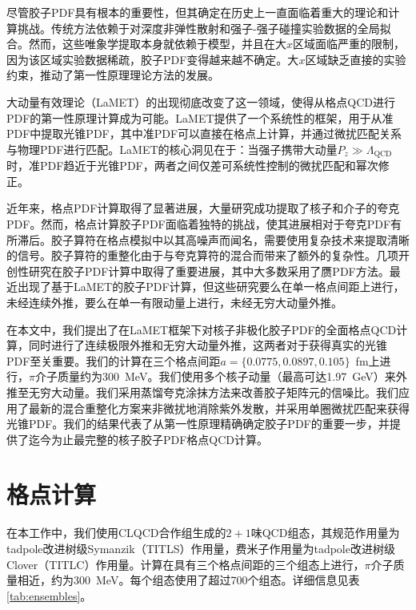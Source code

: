 \documentclass[12pt,a4paper]{ctexart}
\begin{document}
尽管胶子PDF具有根本的重要性，但其确定在历史上一直面临着重大的理论和计算挑战。传统方法依赖于对深度非弹性散射和强子-强子碰撞实验数据的全局拟合\cite{MSHT20,CT18,NNPDF31,NNPDF40,JAM16,CT14}。然而，这些唯象学提取本身就依赖于模型，并且在大$x$区域面临严重的限制，因为该区域实验数据稀疏，胶子PDF变得越来越不确定。大$x$区域缺乏直接的实验约束，推动了第一性原理理论方法的发展。

大动量有效理论（LaMET）\cite{Ji13,Ji14,Ji17}的出现彻底改变了这一领域，使得从格点QCD进行PDF的第一性原理计算成为可能。LaMET提供了一个系统性的框架，用于从准PDF中提取光锥PDF，其中准PDF可以直接在格点上计算，并通过微扰匹配关系与物理PDF进行匹配。LaMET的核心洞见在于：当强子携带大动量$P_z \gg \Lambda_{\text{QCD}}$时，准PDF趋近于光锥PDF，两者之间仅差可系统性控制的微扰匹配和幂次修正。

近年来，格点PDF计算取得了显著进展，大量研究成功提取了核子和介子的夸克PDF\cite{LP3-2018,LP3-2020a,LP3-2021,LP3-2021b,LP3-2022a,LP3-2022b,LP3-2022c,LP3-2023,LP3-2023b,LP3-2024a,LP3-2024b,LP3-2024c,LP3-2025a,LP3-2025b,LP3-2025c,Lin-2025}。然而，格点计算胶子PDF面临着独特的挑战，使其进展相对于夸克PDF有所滞后。胶子算符在格点模拟中以其高噪声而闻名，需要使用复杂技术来提取清晰的信号。胶子算符的重整化由于与夸克算符的混合而带来了额外的复杂性。几项开创性研究在胶子PDF计算中取得了重要进展，其中大多数采用了赝PDF方法\cite{Fan2018,Fan2021,Khan2021,Fan2023,Good2023,Delmar2023,Fan2021a,Good2024,Salas2022}。最近出现了基于LaMET的胶子PDF计算\cite{Good2025a,Good2025b,NieMiera2025}，但这些研究要么在单一格点间距上进行，未经连续外推，要么在单一有限动量上进行，未经无穷大动量外推。

在本文中，我们提出了在LaMET框架下对核子非极化胶子PDF的全面格点QCD计算，同时进行了连续极限外推和无穷大动量外推，这两者对于获得真实的光锥PDF至关重要。我们的计算在三个格点间距$a = \{0.0775, 0.0897, 0.105\}$~fm上进行，$\pi$介子质量约为300~MeV。我们使用多个核子动量（最高可达1.97~GeV）来外推至无穷大动量。我们采用蒸馏夸克涂抹方法\cite{Peardon2009}来改善胶子矩阵元的信噪比。我们应用了最新的混合重整化方案\cite{Ji2021}来非微扰地消除紫外发散，并采用单圈微扰匹配来获得光锥PDF。我们的结果代表了从第一性原理精确确定胶子PDF的重要一步，并提供了迄今为止最完整的核子胶子PDF格点QCD计算。

\section{格点计算}

在本工作中，我们使用CLQCD合作组生成的$2+1$味QCD组态\cite{CLQCD-2024,CLQCD-2025}，其规范作用量为tadpole改进树级Symanzik（TITLS）作用量，费米子作用量为tadpole改进树级Clover（TITLC）作用量。计算在具有三个格点间距的三个组态上进行，$\pi$介子质量相近，约为300~MeV。每个组态使用了超过700个组态。详细信息见表\ref{tab:ensembles}。
\end{document}
